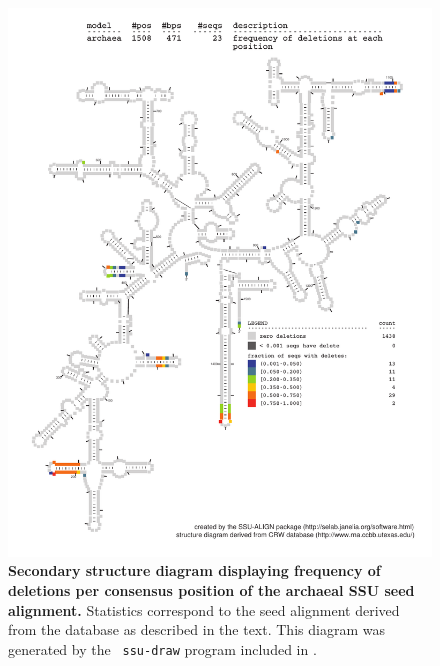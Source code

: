 \begin{figure}
\begin{center}
\includegraphics[width=5.7in]{Figures/archaea-0p1-dall}
\end{center}
\caption[Secondary structure diagram displaying frequency of deletions
  per consensus position of the archaeal SSU seed
  alignment]{\textbf{Secondary structure diagram displaying frequency 
  of deletions per consensus position of the archaeal SSU seed
  alignment.} Statistics correspond to the  seed
  alignment derived from the  database \cite{CannoneGutell02}
  as described in the text. This diagram was generated by the {\tt
  ssu-draw} program included in .}
\label{fig:arcdel}
\end{figure}


